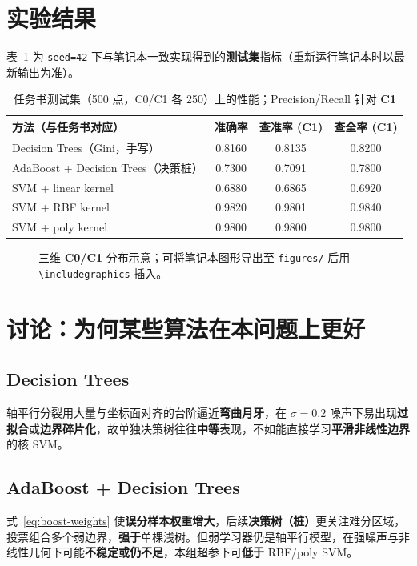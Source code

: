 \documentclass[UTF8,a4paper,11pt]{ctexart}
\begin{document}
\section{实验结果}
表~\ref{tab:metrics} 为 \texttt{seed=42} 下与笔记本一致实现得到的\textbf{测试集}指标（重新运行笔记本时以最新输出为准）。

\begin{table}[htbp]
  \centering
  \caption{任务书测试集（500 点，C0/C1 各 250）上的性能；Precision/Recall 针对 \textbf{C1}}
  \label{tab:metrics}
  \begin{tabular}{lccc}
    \toprule
    方法（与任务书对应） & 准确率 & 查准率 (C1) & 查全率 (C1) \\
    \midrule
    Decision Trees（Gini，手写） & 0.8160 & 0.8135 & 0.8200 \\
    AdaBoost + Decision Trees（决策桩） & 0.7300 & 0.7091 & 0.7800 \\
    SVM + linear kernel & 0.6880 & 0.6865 & 0.6920 \\
    SVM + RBF kernel & 0.9820 & 0.9801 & 0.9840 \\
    SVM + poly kernel & 0.9800 & 0.9800 & 0.9800 \\
    \bottomrule
  \end{tabular}
\end{table}

\begin{figure}[htbp]
  \centering
  \caption{三维 \textbf{C0/C1} 分布示意；可将笔记本图形导出至 \texttt{figures/} 后用 \texttt{\textbackslash includegraphics} 插入。}
  \label{fig:placeholder}
\end{figure}

\section{讨论：为何某些算法在本问题上更好}
\subsection{Decision Trees}
轴平行分裂用大量与坐标面对齐的台阶逼近\textbf{弯曲月牙}，在 $\sigma=0.2$ 噪声下易出现\textbf{过拟合}或\textbf{边界碎片化}，故单独决策树往往\textbf{中等}表现，不如能直接学习\textbf{平滑非线性边界}的核 SVM。

\subsection{AdaBoost + Decision Trees}
式~\eqref{eq:boost-weights} 使\textbf{误分样本权重增大}，后续\textbf{决策树（桩）}更关注难分区域，投票组合多个弱边界，\textbf{强于}单棵浅树。但弱学习器仍是轴平行模型，在强噪声与非线性几何下可能\textbf{不稳定或仍不足}，本组超参下可\textbf{低于} RBF/poly SVM。
\end{document}
